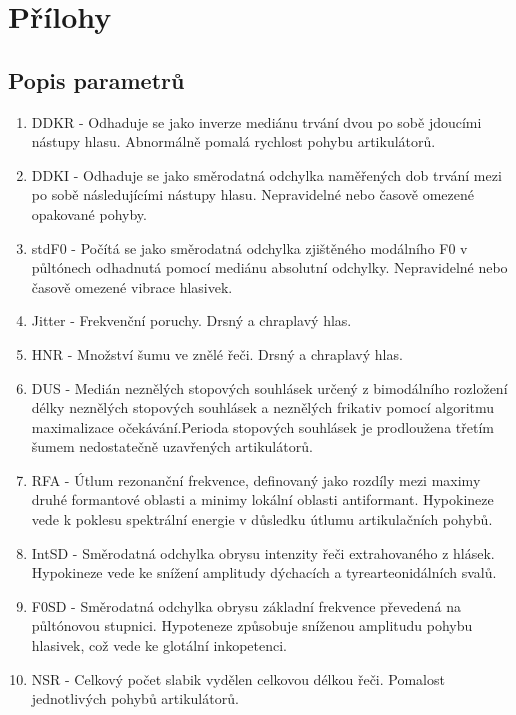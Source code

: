 \documentclass[11pt,a4paper]{article}
\begin{document}
    \section{Přílohy}
        \subsection{Popis parametrů} \label{sec:parametry}
            \begin{enumerate}
                \item DDKR - Odhaduje se jako inverze mediánu trvání dvou po sobě jdoucími nástupy hlasu. Abnormálně pomalá rychlost pohybu artikulátorů.
                \item DDKI -  Odhaduje se jako směrodatná odchylka naměřených dob trvání mezi po sobě následujícími nástupy hlasu. Nepravidelné nebo časově omezené opakované pohyby.
                \item stdF0 - Počítá se jako směrodatná odchylka zjištěného modálního F0 v půltónech odhadnutá pomocí mediánu absolutní odchylky. Nepravidelné nebo časově omezené vibrace hlasivek.
                \item Jitter -  Frekvenční poruchy. Drsný a chraplavý hlas.
                \item HNR - Množství šumu ve znělé řeči. Drsný a chraplavý hlas.
                \item DUS - Medián neznělých stopových souhlásek určený z bimodálního rozložení délky neznělých stopových souhlásek a neznělých frikativ pomocí algoritmu maximalizace očekávání.Perioda stopových souhlásek je prodloužena třetím šumem nedostatečně uzavřených artikulátorů.
                \item RFA - Útlum rezonanční frekvence, definovaný jako rozdíly mezi maximy druhé formantové oblasti a minimy lokální oblasti antiformant. Hypokineze vede k poklesu spektrální energie v důsledku útlumu artikulačních pohybů.
                \item IntSD - Směrodatná odchylka obrysu intenzity řeči extrahovaného z hlásek. Hypokineze vede ke snížení amplitudy dýchacích a tyrearteonidálních svalů.
                \item F0SD - Směrodatná odchylka obrysu základní frekvence převedená na půltónovou stupnici. Hypoteneze způsobuje sníženou amplitudu pohybu hlasivek, což vede ke glotální inkopetenci.
                \item NSR -  Celkový počet slabik vydělen celkovou délkou řeči. Pomalost jednotlivých pohybů artikulátorů.
            \end{enumerate}
\newpage


\end{document}
